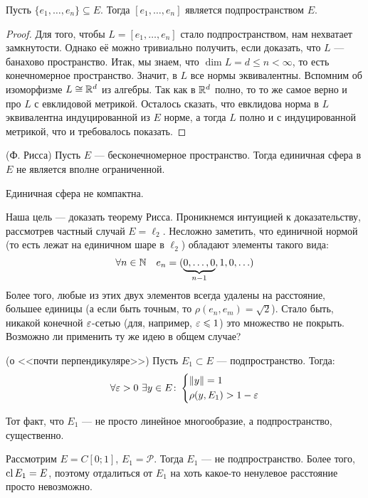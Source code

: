 \begin{theorem}
	Пусть $\{e_1, \ldots, e_n\} \subseteq E$. Тогда $[e_1, \ldots, e_n]$ является подпространством $E$.
\end{theorem}

\begin{proof}
	Для того, чтобы $L = [e_1, \ldots, e_n]$ стало подпространством, нам нехватает замкнутости. Однако её можно тривиально получить, если доказать, что $L$ --- банахово пространство. Итак, мы знаем, что $\dim L = d \le n < \infty$, то есть конечномерное пространство. Значит, в $L$ все нормы эквивалентны. Вспомним об изоморфизме $L \cong \mathbb{R}^d$ из алгебры. Так как в $\mathbb{R}^d$ полно, то то же самое верно и про $L$ с евклидовой метрикой. Осталось сказать, что евклидова норма в $L$ эквивалентна индуцированной из $E$ норме, а тогда $L$ полно и с индуцированной метрикой, что и требовалось показать.
\end{proof}

\begin{theorem} (Ф. Рисса)
	Пусть $E$ --- бесконечномерное пространство. Тогда единичная сфера в $E$ не является вполне ограниченной.
\end{theorem}

\begin{corollary}
	Единичная сфера не компактна.
\end{corollary}

\begin{note}
	Наша цель --- доказать теорему Рисса. Проникнемся интуицией к доказательству, рассмотрев частный случай $E = \ell_2$. Несложно заметить, что единичной нормой (то есть лежат на единичном шаре в $\ell_2$) обладают элементы такого вида:
	\[
		\forall n \in \mathbb{N}\quad e_n = (\underbrace{0, \ldots, 0}_{n - 1}, 1, 0, \ldots)
	\]
	Более того, любые из этих двух элементов всегда удалены на расстояние, большее единицы (а если быть точным, то $\rho(e_n, e_m) = \sqrt{2}$). Стало быть, никакой конечной $\varepsilon$-сетью (для, например, $\varepsilon \leqslant 1$) это множество не покрыть. Возможно ли применить ту же идею в общем случае?
\end{note}

\begin{lemma} (о <<почти перпендикуляре>>)
	Пусть $E_1 \subset E$ --- подпространство. Тогда:
	\[
		\forall \varepsilon > 0\ \exists y \in E \colon \left\{ \begin{aligned} 
			&{\|y\| = 1}
			\\
			&{\rho(y, E_1) > 1 - \varepsilon}
		 \end{aligned} \right.
	\]
\end{lemma}

\begin{note}
	Тот факт, что $E_1$ --- не просто линейное многообразие, а подпространство, существенно.
	
	Рассмотрим $E = C[0; 1]$, $E_1 = \mathcal{P}$. Тогда $E_1$ --- не подпространство. Более того, $\operatorname{cl} E_1 = E$, поэтому отдалиться от $E_1$ на хоть какое-то ненулевое расстояние просто невозможно.
\end{note}

